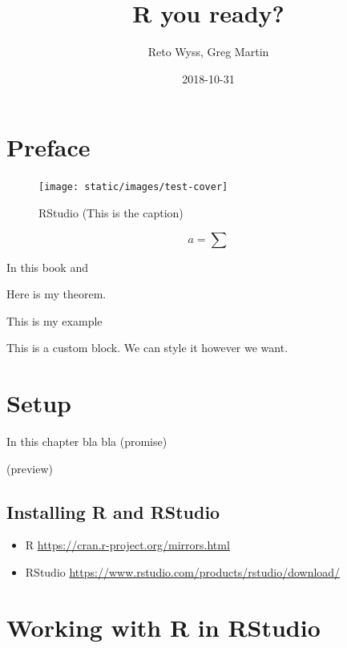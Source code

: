 \documentclass[]{book}
\title{R you ready?}
\author{Reto Wyss, Greg Martin}
\date{2018-10-31}
\providecommand{\tightlist}{%
  \setlength{\itemsep}{0pt}\setlength{\parskip}{0pt}}
\theoremstyle{definition}
\theoremstyle{definition}
\theoremstyle{definition}
\theoremstyle{remark}
\let\BeginKnitrBlock\begin \let\EndKnitrBlock\end
\begin{document}
\maketitle

{
\setcounter{tocdepth}{1}
\tableofcontents
}
\chapter*{Preface}\label{preface}

\begin{figure}
\texttt{[image: static/images/test-cover]} \caption{RStudio (This is the caption)}\label{fig:asd-view}
\end{figure}

\[
a = \sum
\]

In this book \citet{R-base} and \citet{R-tidyverse}

\BeginKnitrBlock{definition}
\protect\hypertarget{def:unnamed-chunk-3}{}{\label{def:unnamed-chunk-3}
}Here is my theorem.
\EndKnitrBlock{definition}

\BeginKnitrBlock{example}
\protect\hypertarget{exm:My-Example}{}{\label{exm:My-Example} }This is my
example
\EndKnitrBlock{example}

\begin{foo}
This is a custom block. We can style it however we want.
\end{foo}

\chapter{Setup}\label{setup}

In this chapter bla bla (promise)

(preview)

\section{Installing R and RStudio}\label{installing-r-and-rstudio}

\begin{itemize}
\tightlist
\item
  R \url{https://cran.r-project.org/mirrors.html}
\item
  RStudio \url{https://www.rstudio.com/products/rstudio/download/}
\end{itemize}

\chapter{Working with R in RStudio}\label{working-with-r-in-rstudio}
\end{document}
